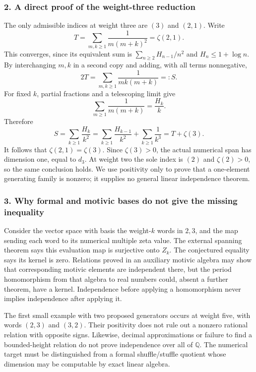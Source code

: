 \documentclass[11pt]{article}
\begin{document}
\subsubsection{2. A direct proof of the weight-three reduction}
The only admissible indices at weight three are $(3)$ and $(2,1)$. Write
\[T=\sum_{m,k\ge1}\frac1{m(m+k)^2}=\zeta(2,1).\]
This converges, since its equivalent sum is $\sum_{n\ge2}H_{n-1}/n^2$ and $H_n\le1+\log n$. By interchanging $m,k$ in a second copy and adding, with all terms nonnegative,
\[2T=\sum_{m,k\ge1}\frac1{mk(m+k)}=:S.\]
For fixed $k$, partial fractions and a telescoping limit give
\[\sum_{m\ge1}\frac1{m(m+k)}=\frac{H_k}{k}.\]
Therefore
\[S=\sum_{k\ge1}\frac{H_k}{k^2}
=\sum_{k\ge1}\frac{H_{k-1}}{k^2}+\sum_{k\ge1}\frac1{k^3}
=T+\zeta(3).\]
It follows that $\zeta(2,1)=\zeta(3)$. Since $\zeta(3)>0$, the actual numerical span has dimension one, equal to $d_3$. At weight two the sole index is $(2)$ and $\zeta(2)>0$, so the same conclusion holds. We use positivity only to prove that a one-element generating family is nonzero; it supplies no general linear independence theorem.

\subsubsection{3. Why formal and motivic bases do not give the missing inequality}
Consider the vector space with basis the weight-$k$ words in $2,3$, and the map sending each word to its numerical multiple zeta value. The external spanning theorem says this evaluation map is surjective onto $Z_k$. The conjectured equality says its kernel is zero. Relations proved in an auxiliary motivic algebra may show that corresponding motivic elements are independent there, but the period homomorphism from that algebra to real numbers could, absent a further theorem, have a kernel. Independence before applying a homomorphism never implies independence after applying it.

The first small example with two proposed generators occurs at weight five, with words $(2,3)$ and $(3,2)$. Their positivity does not rule out a nonzero rational relation with opposite signs. Likewise, decimal approximations or failure to find a bounded-height relation do not prove independence over all of $\mathbb Q$. The numerical target must be distinguished from a formal shuffle/stuffle quotient whose dimension may be computable by exact linear algebra.
\end{document}
